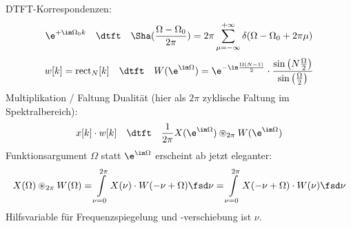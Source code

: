 \begin{Werkzeug}
DTFT-Korrespondenzen:
\begin{align}
\e^{+\im\Omega_0 k} \quad\dtft\quad \Sha(\frac{\Omega-\Omega_0}{2\pi})
= 2\pi \sum\limits_{\mu=-\infty}^{+\infty}
\delta(\Omega-\Omega_0 + 2\pi\mu)
\end{align}
%
\begin{equation}
w[k] = \mathrm{rect}_N[k]
\quad\dtft\quad
W(\e^{\im\Omega})=\e^{-\im\frac{\Omega(N-1)}{2}}\cdot\frac{\sin\left(N\frac{\Omega}{2}\right)}{\sin\left(\frac{\Omega}{2}\right)}
\end{equation}
%
Multiplikation / Faltung Dualität (hier als $2\pi$ zyklische Faltung im Spektralbereich):
\begin{align}
x[k] \cdot w[k] \quad\dtft\quad \frac{1}{2\pi} X(\e^{\im \Omega}) \circledast_{2\pi} W(\e^{\im \Omega})
\end{align}
%
Funktionsargument $\Omega$ statt $\e^{\im \Omega}$ erscheint ab jetzt eleganter:
\begin{align}
X(\Omega) \circledast_{2\pi} W(\Omega) =
\int\limits_{\nu=0}^{2\pi} X(\nu) \cdot W(-\nu + \Omega) \fsd \nu =
\int\limits_{\nu=0}^{2\pi} X(-\nu+\Omega) \cdot W(\nu) \fsd \nu
\end{align}
Hilfsvariable für Frequenzspiegelung und -verschiebung ist $\nu$.
\end{Werkzeug}
